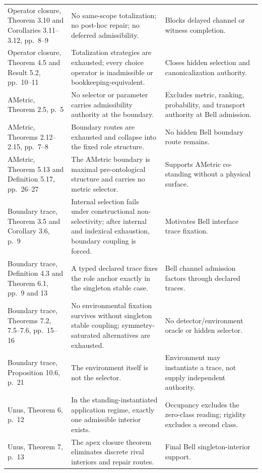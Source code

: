 \documentclass[11pt]{article}
\theoremstyle{definition}
\begin{document}
\begin{longtable}{L{0.22\textwidth}L{0.38\textwidth}L{0.32\textwidth}}
Operator closure, Theorem 3.10 and Corollaries 3.11--3.12, pp.~8--9 \cite{MaleySameScope2026} & No same-scope totalization; no post-hoc repair; no deferred admissibility. & Blocks delayed channel or witness completion.\\
Operator closure, Theorem 4.5 and Result 5.2, pp.~10--11 \cite{MaleySameScope2026} & Totalization strategies are exhausted; every choice operator is inadmissible or bookkeeping-equivalent. & Closes hidden selection and canonicalization authority.\\
AMetric, Theorem 2.5, p.~5 \cite{MaleyAMetricBoundary2026} & No selector or parameter carries admissibility authority at the boundary. & Excludes metric, ranking, probability, and transport authority at Bell admission.\\
AMetric, Theorems 2.12--2.15, pp.~7--8 \cite{MaleyAMetricBoundary2026} & Boundary routes are exhausted and collapse into the fixed role structure. & No hidden Bell boundary route remains.\\
AMetric, Theorem 5.13 and Definition 5.17, pp.~26--27 \cite{MaleyAMetricBoundary2026} & The AMetric boundary is maximal pre-ontological structure and carries no metric selector. & Supports AMetric co-standing without a physical surface.\\
Boundary trace, Theorem 3.5 and Corollary 3.6, p.~9 \cite{MaleyBoundaryTrace2026} & Internal selection fails under constructional non-selectivity; after internal and indexical exhaustion, boundary coupling is forced. & Motivates Bell interface trace fixation.\\
Boundary trace, Definition 4.3 and Theorem 6.1, pp.~9 and 13 \cite{MaleyBoundaryTrace2026} & A typed declared trace fixes the role anchor exactly in the singleton stable case. & Bell channel admission factors through declared traces.\\
Boundary trace, Theorems 7.2, 7.5--7.6, pp.~15--16 \cite{MaleyBoundaryTrace2026} & No environmental fixation survives without singleton stable coupling; symmetry-saturated alternatives are exhausted. & No detector/environment oracle or hidden selector.\\
Boundary trace, Proposition 10.6, p.~21 \cite{MaleyBoundaryTrace2026} & The environment itself is not the selector. & Environment may instantiate a trace, not supply independent authority.\\
Unus, Theorem 6, p.~12 \cite{MaleyUnus2026} & In the standing-instantiated application regime, exactly one admissible interior exists. & Occupancy excludes the zero-class reading; rigidity excludes a second class.\\
Unus, Theorem 7, p.~13 \cite{MaleyUnus2026} & The apex closure theorem eliminates discrete rival interiors and repair routes. & Final Bell singleton-interior support.\\
\bottomrule
\end{longtable}
\normalsize
\end{document}
